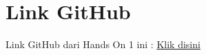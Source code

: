 \documentclass[11pt,a4paper]{article}
\begin{document}
\section{Link GitHub}
	Link GitHub dari Hands On 1 ini : \href{https://github.com/BilhaqAD07/Sistem-Operasi.git}{Klik disini}


\newpage


\end{document}
